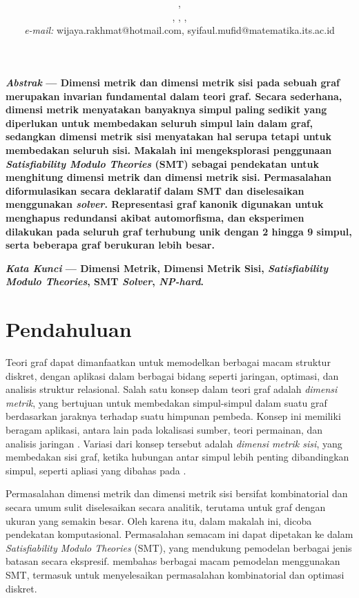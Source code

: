 \documentclass[10pt,twocolumn]{article}
\title{
	\Huge\titleBahasa
}
\author{
	\normalsize\theAuthor, \supervisor \\
	\normalsize\departmentNameBahasa, \facultyNameBahasa, \campusName, \theCity \\
	\normalsize\textit{e-mail:} wijaya.rakhmat@hotmail.com, syifaul.mufid@matematika.its.ac.id
}
\date{}
\newcommand{\foreign}[1]{\foreignlanguage{english}{\textit{#1}}}
\begin{document}
\maketitle

{
	\small

	\noindent \textbf{\textit{Abstrak} --- Dimensi metrik dan dimensi metrik sisi pada sebuah graf merupakan invarian fundamental dalam teori graf. Secara sederhana, dimensi metrik menyatakan banyaknya simpul paling sedikit yang diperlukan untuk membedakan seluruh simpul lain dalam graf, sedangkan dimensi metrik sisi menyatakan hal serupa tetapi untuk membedakan seluruh sisi. Makalah ini mengeksplorasi penggunaan \foreign{Satisfiability Modulo Theories} (SMT) sebagai pendekatan untuk menghitung dimensi metrik dan dimensi metrik sisi. Permasalahan diformulasikan secara deklaratif dalam SMT dan diselesaikan menggunakan \foreign{solver}. Representasi graf kanonik digunakan untuk menghapus redundansi akibat automorfisma, dan eksperimen dilakukan pada seluruh graf terhubung unik dengan 2 hingga 9 simpul, serta beberapa graf berukuran lebih besar.}

	\vspace{0.5\baselineskip}

	\noindent \textbf{\textit{Kata Kunci} --- Dimensi Metrik, Dimensi Metrik Sisi, \foreign{Satisfiability Modulo Theories}, SMT \foreign{Solver}, \foreign{NP-hard}.}
}

\section{Pendahuluan}

Teori graf dapat dimanfaatkan untuk memodelkan berbagai macam struktur diskret, dengan aplikasi dalam berbagai bidang seperti jaringan, optimasi, dan analisis struktur relasional. Salah satu konsep dalam teori graf adalah \emph{dimensi metrik}, yang bertujuan untuk membedakan simpul-simpul dalam suatu graf berdasarkan jaraknya terhadap suatu himpunan pembeda. Konsep ini memiliki beragam aplikasi, antara lain pada lokalisasi sumber, teori permainan, dan analisis jaringan \cite{tillquist2023}. Variasi dari konsep tersebut adalah \emph{dimensi metrik sisi}, yang membedakan sisi graf, ketika hubungan antar simpul lebih penting dibandingkan simpul, seperti apliasi yang dibahas pada \cite{awadiyah2019}.

Permasalahan dimensi metrik dan dimensi metrik sisi bersifat kombinatorial dan secara umum sulit diselesaikan secara analitik, terutama untuk graf dengan ukuran yang semakin besar. Oleh karena itu, dalam makalah ini, dicoba pendekatan komputasional. Permasalahan semacam ini dapat dipetakan ke dalam \foreign{Satisfiability Modulo Theories} (SMT), yang mendukung pemodelan berbagai jenis batasan secara ekspresif. \cite{smt-app} membahas berbagai macam pemodelan menggunakan SMT, termasuk untuk menyelesaikan permasalahan kombinatorial dan optimasi diskret.
\end{document}
